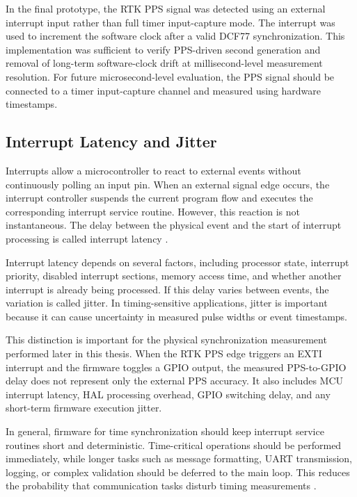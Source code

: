 In the final prototype, the RTK PPS signal was detected using an external interrupt input rather than full timer input-capture mode. The interrupt was used to increment the software clock after a valid DCF77 synchronization. This implementation was sufficient to verify PPS-driven second generation and removal of long-term software-clock drift at millisecond-level measurement resolution. For future microsecond-level evaluation, the PPS signal should be connected to a timer input-capture channel and measured using hardware timestamps.

\subsection{Interrupt Latency and Jitter}

Interrupts allow a microcontroller to react to external events without continuously polling an input pin. When an external signal edge occurs, the interrupt controller suspends the current program flow and executes the corresponding interrupt service routine. However, this reaction is not instantaneous. The delay between the physical event and the start of interrupt processing is called interrupt latency \cite{kopetz2011realtime,stm32F0ReferenceManual}.

Interrupt latency depends on several factors, including processor state, interrupt priority, disabled interrupt sections, memory access time, and whether another interrupt is already being processed. If this delay varies between events, the variation is called jitter. In timing-sensitive applications, jitter is important because it can cause uncertainty in measured pulse widths or event timestamps.

This distinction is important for the physical synchronization measurement performed later in this thesis. When the RTK PPS edge triggers an EXTI interrupt and the firmware toggles a GPIO output, the measured PPS-to-GPIO delay does not represent only the external PPS accuracy. It also includes MCU interrupt latency, HAL processing overhead, GPIO switching delay, and any short-term firmware execution jitter.

In general, firmware for time synchronization should keep interrupt service routines short and deterministic. Time-critical operations should be performed immediately, while longer tasks such as message formatting, UART transmission, logging, or complex validation should be deferred to the main loop. This reduces the probability that communication tasks disturb timing measurements \cite{kopetz2011realtime}.


